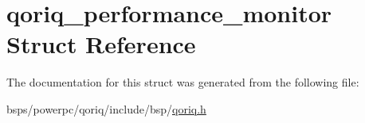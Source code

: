 \hypertarget{structqoriq__performance__monitor}{}\section{qoriq\+\_\+performance\+\_\+monitor Struct Reference}
\label{structqoriq__performance__monitor}


The documentation for this struct was generated from the following file\+:\begin{DoxyCompactItemize}
\item 
bsps/powerpc/qoriq/include/bsp/\mbox{\hyperlink{qoriq_8h}{qoriq.\+h}}\end{DoxyCompactItemize}
